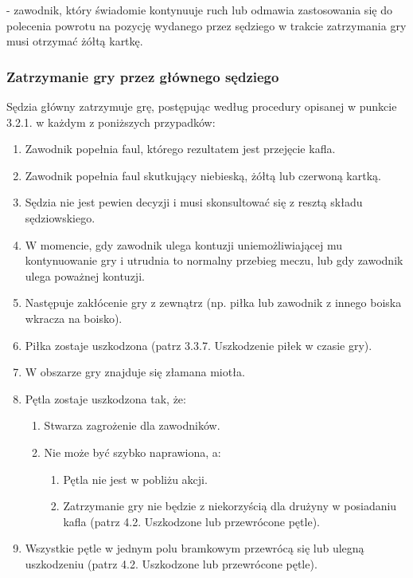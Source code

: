 \documentclass[12pt]{article}
\newcommand\yellowcard{\bgroup\color{yellow}\markoverwith{\textcolor{yellow}{\rule[-0.5ex]{2pt}{0.4pt}}}\ULon}
\begin{document}
\yellowcard{Żółta kartka} - zawodnik, który świadomie kontynuuje ruch lub
odmawia zastosowania się do polecenia powrotu na pozycję wydanego przez
sędziego w trakcie zatrzymania gry musi otrzymać żółtą kartkę.

\subsubsection{Zatrzymanie gry przez głównego sędziego}

Sędzia główny zatrzymuje grę, postępując według procedury opisanej w
punkcie 3.2.1. w każdym z poniższych przypadków:

\begin{enumerate}
	\item Zawodnik popełnia faul, którego rezultatem jest przejęcie kafla.

	\item Zawodnik popełnia faul skutkujący niebieską, żółtą lub czerwoną
	      kartką.

	\item Sędzia nie jest pewien decyzji i musi skonsultować się z resztą
	      składu sędziowskiego.

	\item W momencie, gdy zawodnik ulega kontuzji uniemożliwiającej mu
	      kontynuowanie gry i utrudnia to normalny przebieg meczu, lub gdy
	      zawodnik ulega poważnej kontuzji.

	\item Następuje zakłócenie gry z zewnątrz (np. piłka lub zawodnik z innego
	      boiska wkracza na boisko).

	\item Piłka zostaje uszkodzona (patrz 3.3.7. Uszkodzenie piłek w czasie
	      gry).

	\item W obszarze gry znajduje się złamana miotła.

	\item Pętla zostaje uszkodzona tak, że:
	      \begin{enumerate}
		      \item Stwarza zagrożenie dla zawodników.

		      \item Nie może być szybko naprawiona, a:

		            \begin{enumerate}
			            \item
			                  Pętla nie jest w pobliżu akcji.
			            \item
			                  Zatrzymanie gry nie będzie z niekorzyścią dla drużyny w posiadaniu
			                  kafla (patrz 4.2. Uszkodzone lub przewrócone pętle).
		            \end{enumerate}
	      \end{enumerate}
	\item Wszystkie pętle w jednym polu bramkowym przewrócą się lub ulegną
	      uszkodzeniu (patrz 4.2. Uszkodzone lub przewrócone pętle).


\end{enumerate}
\end{document}
